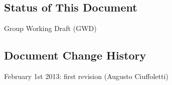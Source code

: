 \documentclass[12pt]{article}  %
\begin{document}
\newcommand{\mixin}[2]{
\begin{tabular}{ll}
\hline
Model attribute & value \\ \hline
scheme & http://ogf.schemas.sla/occi/monitoring\# \\
term & #1 \\
attributes & #2 \\ \hline
\end{tabular}
}

\newcommand{\extramixin}[3]{
\begin{tabular}{ll}
\hline
Model attribute & value \\ \hline
scheme & http://provider.com/monitoring\# \\
term & #1 \\
related & http://schemas.ogf.org/occi/monitoring\##3 \\ 
attributes & #2 \\ \hline
\end{tabular}
\vspace{0.5cm}
}

\begin{center}
\makeatletter
\Large\bf\textsf \@title
\makeatother
\end{center}



\subsection*{Status of This Document}

Group Working Draft (GWD)



\subsection*{Document Change History}

February 1st 2013: first revision (Augusto Ciuffoletti)
\end{document}

